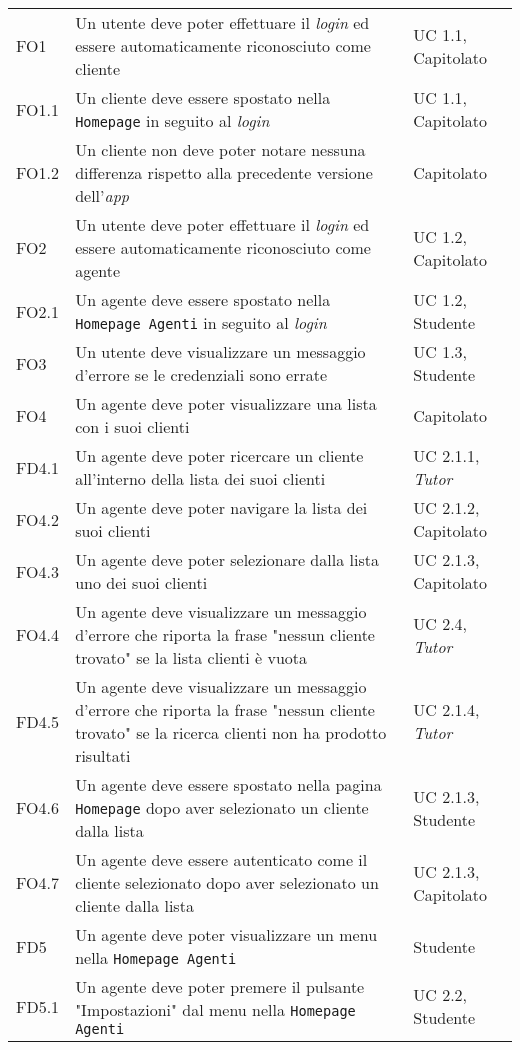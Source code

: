 \begin{center}
\begin{longtable}{|p{2.25cm}|p{7.75cm}|p{2.25cm}|}
    FO1 & Un utente deve poter effettuare il \textit{login} ed essere automaticamente riconosciuto come cliente & UC 1.1, Capitolato \\
    FO1.1 & Un cliente deve essere spostato nella \texttt{Homepage} in seguito al \textit{login} & UC 1.1, Capitolato \\
    FO1.2 & Un cliente non deve poter notare nessuna differenza rispetto alla precedente versione dell'\textit{app} & Capitolato \\
    FO2 & Un utente deve poter effettuare il \textit{login} ed essere automaticamente riconosciuto come agente & UC 1.2, Capitolato \\
    FO2.1 & Un agente deve essere spostato nella \texttt{Homepage Agenti} in seguito al \textit{login} & UC 1.2, Studente \\
    FO3 & Un utente deve visualizzare un messaggio d'errore se le credenziali sono errate & UC 1.3, Studente \\
    FO4 & Un agente deve poter visualizzare una lista con i suoi clienti & Capitolato \\
    FD4.1 & Un agente deve poter ricercare un cliente all'interno della lista dei suoi clienti & UC 2.1.1, \textit{Tutor} \\
    FO4.2 & Un agente deve poter navigare la lista dei suoi clienti & UC 2.1.2, Capitolato \\
    FO4.3 & Un agente deve poter selezionare dalla lista uno dei suoi clienti & UC 2.1.3, Capitolato \\
    FO4.4 & Un agente deve visualizzare un messaggio d'errore che riporta la frase "nessun cliente trovato" se la lista clienti è vuota & UC 2.4, \textit{Tutor} \\
    FD4.5 & Un agente deve visualizzare un messaggio d'errore che riporta la frase "nessun cliente trovato" se la ricerca clienti non ha prodotto risultati & UC 2.1.4, \textit{Tutor} \\
    FO4.6 & Un agente deve essere spostato nella pagina \texttt{Homepage} dopo aver selezionato un cliente dalla lista & UC 2.1.3, Studente \\
    FO4.7 & Un agente deve essere autenticato come il cliente selezionato dopo aver selezionato un cliente dalla lista & UC 2.1.3, Capitolato \\
    FD5 & Un agente deve poter visualizzare un menu nella \texttt{Homepage Agenti} & Studente \\
    FD5.1 & Un agente deve poter premere il pulsante "Impostazioni" dal menu nella \texttt{Homepage Agenti} & UC 2.2, Studente \\

\end{longtable}
\end{center}
